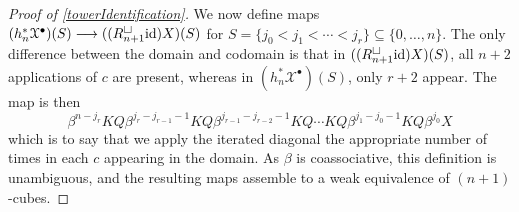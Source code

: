 \documentclass[11pt]{amsart} \renewcommand{\baselinestretch}{1.2}
\theoremstyle{plain}
\theoremstyle{definition}
\renewcommand{\to}{\longrightarrow}
\newcommand{\calx}{\mathcal{X}}
\newcommand{\Id}{\mathrm{id}}
\newcommand{\plainD}{R}
\begin{document}
\begin{Bousfield-Kan spectral sequence}
\begin{proof}[Proof of \ref{towerIdentification}]
We now define maps $(h_n^*\calx^\bullet)(S)\to (({\plainD}_{n+1}^{\smash{\square}}\Id )X)(S)$ for $S=\{j_0<j_1<\cdots<j_r\}\subseteq\{0,\ldots,n\}$. 
The only difference between the domain and codomain is that in $(({\plainD}_{n+1}^{\smash{\square}}\Id )X)(S)$, all $n+2$ applications of $c$ are present, whereas in $(h_n^*\calx^\bullet)(S)$, only $r+2$ appear. The map is then
\[\beta^{n-j_r}KQ\beta^{j_r-j_{r-1}-1}KQ\beta^{j_{r-1}-j_{r-2}-1}KQ\cdots KQ\beta^{j_{1}-j_0-1}KQ\beta^{j_0}X\]
which is to say that we apply the iterated diagonal the appropriate number of times in each $c$ appearing in the domain. As $\beta$ is coassociative, this definition is unambiguous, and the resulting maps assemble to a weak equivalence of $(n+1)$-cubes. 
\end{proof}




\end{Bousfield-Kan spectral sequence}
\end{document}

